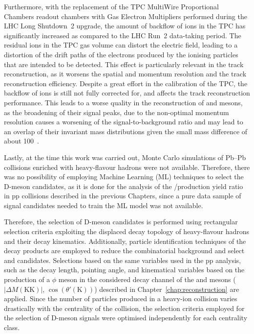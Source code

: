 Furthermore, with the replacement of the TPC MultiWire Proportional Chambers readout chambers with Gas Electron Multipliers performed during the LHC Long Shutdown~2 upgrade, the amount of backflow of ions in the TPC has significantly increased as compared to the LHC Run~2 data-taking period. The residual ions in the TPC gas volume can distort the electric field, leading to a distortion of the drift paths of the electrons produced by the ionising particles that are intended to be detected. This effect is particularly relevant in the track reconstruction, as it worsens the spatial and momentum resolution and the track reconstruction efficiency. Despite a great effort in the calibration of the TPC, the backflow of ions is still not fully corrected for, and affects the track reconstruction performance. This leads to a worse quality in the reconstruction of  \ds and \dpl mesons, as the broadening of their signal peaks, due to the non-optimal momentum resolution causes a worsening of the signal-to-background ratio and may lead to an overlap of their invariant mass distributions given the small mass difference of about 100~\mevcc.


Lastly, at the time this work was carried out, Monte Carlo simulations of Pb--Pb collisions enriched with heavy-flavour hadrons were not available. Therefore, there was no possibility of employing Machine Learning (ML) techniques to select the D-meson candidates, as it is done for the analysis of the \ds/\dpl production yield ratio in pp collisions described in the previous Chapters, since a pure data sample of signal candidates needed to train the ML model was not available. 

Therefore, the selection of D-meson candidates is performed using rectangular selection criteria exploiting the displaced decay topology of heavy-flavour hadrons and their decay kinematics. Additionally, particle identification techniques of the decay products are employed to reduce the combinatorial background and select \ds and \dpl candidates. Selections based on the same variables used in the pp analysis, such as the decay length, pointing angle, and kinematical variables based on the production of a $\phi$ meson in the considered decay channel of the \ds and \dpl mesons ($\lvert\Delta M(\mathrm{KK})\rvert$, $\cos\left(\theta'(\mathrm K)\right)$) described in Chapter~\ref{chap:reconstruction} are applied. Since the number of particles produced in a heavy-ion collision varies drastically with the centrality of the collision, the selection criteria employed for the selection of D-meson signals were optimised independently for each centrality class.

